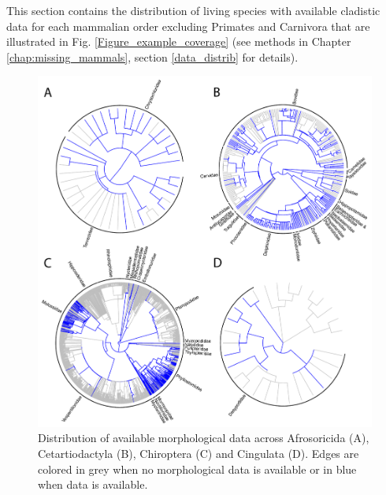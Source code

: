 This section contains the distribution of living species with available cladistic data for each mammalian order excluding Primates and Carnivora that are illustrated in Fig. \ref{Figure_example_coverage} (see methods in Chapter \ref{chap:missing_mammals}, section \ref{data_distrib} for details).

\begin{figure}[!ht]
\centering
    \includegraphics[width=\textwidth]{Supplementaries/Figures/MissingMammals/Combined_phy1.pdf}
\caption[Available data in Afrosoricida, Cetartiodactyla, Chiroptera and Dasyuromorphia]{Distribution of available morphological data across Afrosoricida (A), Cetartiodactyla (B), Chiroptera (C) and Cingulata (D). Edges are colored in grey when no morphological data is available or in blue when data is available.}
\label{Supp_combined_phy1}
\end{figure}

